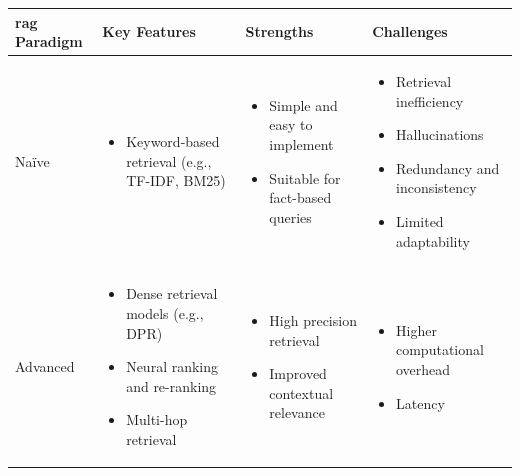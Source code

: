 \begin{table}[htbp]
    \centering
    \scriptsize
    \begin{tabularx}{\textwidth}{|>{\centering\arraybackslash}p{1.5cm}|X|X|X|}
      \hline
      \textbf{\gls{rag} Paradigm} & \textbf{Key Features} & \textbf{Strengths} & \textbf{Challenges}\\
      \hline
          \begin{center}
            Na\"ive
          \end{center} & \begin{itemize}[nosep, left=0pt]
        \item Keyword-based retrieval (e.g., TF-IDF, BM25)
      \end{itemize} & \begin{itemize}[nosep, left=0pt]
        \item Simple and easy to implement
        \item Suitable for fact-based queries
      \end{itemize}& \begin{itemize}[nosep, left=0pt]
        \item Retrieval inefficiency
        \item Hallucinations
        \item Redundancy and inconsistency
        \item Limited adaptability
      \end{itemize}\\
      \hline
      \begin{center}
      Advanced
      \end{center} & \begin{itemize}[nosep, left=0pt]
        \item Dense retrieval models (e.g., DPR)
        \item Neural ranking and re-ranking
        \item Multi-hop retrieval
      \end{itemize} & \begin{itemize}[nosep, left=0pt]
        \item High precision retrieval
        \item Improved contextual relevance
      \end{itemize} & \begin{itemize}[nosep, left=0pt]
        \item Higher computational overhead
        \item Latency
      \end{itemize}\\

\end{tabularx}
\end{table}
